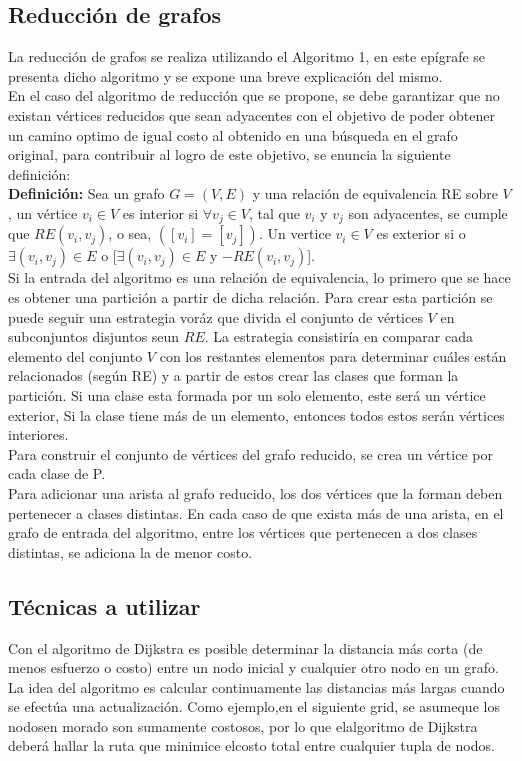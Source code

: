 \documentclass[a4,papper]{IEEEtran}
\begin{document}
\subsection{\bf Reducción de grafos}
\noindent La reducción de grafos se realiza utilizando el Algoritmo 1, en este epígrafe se presenta dicho algoritmo y se expone una breve explicación del mismo.\\

\noindent En el caso del algoritmo de reducción que se propone, se debe garantizar que no existan vértices reducidos que sean adyacentes con el objetivo de poder obtener un camino optimo de igual costo al obtenido en una búsqueda en el grafo original, para contribuir al logro de este objetivo, se enuncia la siguiente definición:\\
{\bf Definición:}
Sea un grafo $G=(V,E)$ y una relación de equivalencia RE sobre $V$, un vértice $v_i \in V$ es interior si $\forall v_j \in V$, tal que $v_i$ y $v_j$ son adyacentes, se cumple que $RE(v_i,v_j)$, o sea, $([v_i] = [v_j])$. Un vertice $v_i \in V$  es exterior si o $\exists (v_i,v_j) \in E$ o [$ \exists (v_i,v_j) \in E$ y $-RE(v_i,v_j)$].\\

\noindent Si la entrada del algoritmo es una relación de equivalencia, lo primero que se hace es obtener una partición a partir de dicha relación. Para crear esta partición se puede seguir una estrategia voráz que divida el conjunto de vértices $V$ en subconjuntos disjuntos seun $RE$. La estrategia consistiría en comparar cada elemento del conjunto $V$ con los restantes elementos para determinar cuáles están relacionados (según RE) y a partir de estos crear las clases que forman la partición.
Si una clase esta formada por un solo elemento, este será un vértice exterior, Si la clase tiene más de un elemento, entonces todos estos serán vértices interiores.\\
Para construir el conjunto de vértices del grafo reducido, se crea un vértice por cada clase de P.\\
Para adicionar una arista al grafo reducido, los dos vértices que la forman deben pertenecer a clases distintas. En cada caso de que exista más de una arista, en el grafo de entrada del algoritmo, entre los vértices que pertenecen a dos clases distintas, se adiciona la de menor costo.

\subsection{\bf Técnicas a utilizar}
\noindent Con el algoritmo de Dijkstra es posible determinar la distancia más corta (de menos esfuerzo o costo) entre un nodo inicial y cualquier otro nodo en un grafo. La idea del algoritmo es calcular continuamente las distancias más largas cuando se efectúa una actualización. Como ejemplo,en el siguiente grid, se asumeque los nodosen morado son sumamente costosos, por lo que elalgoritmo de Dijkstra deberá hallar la ruta que minimice elcosto total entre cualquier tupla de nodos.
\end{document}
